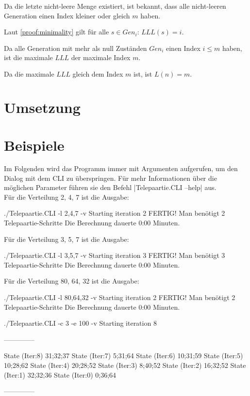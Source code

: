 \documentclass[a4paper,10pt,ngerman]{scrartcl}
\begin{document}
Da die letzte nicht-leere Menge existiert, ist bekannt, dass alle nicht-leeren Generation einen Index kleiner oder gleich \(m\) haben.

Laut \cref{proof:minimality} gilt für alle \(s \in Gen_i\): \(LLL(s) = i\).

Da alle Generation mit mehr als null Zuständen \(Gen_i\) einen Index \(i \leq m\) haben, ist die maximale \(LLL\) der maximale Index \(m\).

Da die maximale \(LLL\) gleich dem Index \(m\) ist, ist \(L(n) = m\).

\section{Umsetzung}

\section{Beispiele}
Im Folgenden wird das Programm immer mit Argumenten aufgerufen, um den Dialog mit dem CLI zu überspringen. Für mehr Informationen über die möglichen Parameter führen sie den Befehl |Telepaartie.CLI --help| aus.\\
\vspace{0.5cm}
Für die Verteilung 2, 4, 7 ist die Ausgabe:
\begin{lstcs}
./Telepaartie.CLI -l 2,4,7 -v
Starting iteration 2
FERTIG!
Man benötigt 2 Telepaartie-Schritte
Die Berechnung dauerte 0:00 Minuten.
\end{lstcs}
Für die Verteilung 3, 5, 7 ist die Ausgabe:
\begin{lstcs}
./Telepaartie.CLI -l 3,5,7 -v
Starting iteration 3
FERTIG!
Man benötigt 3 Telepaartie-Schritte
Die Berechnung dauerte 0:00 Minuten.
\end{lstcs}
Für die Verteilung 80, 64, 32 ist die Ausgabe:
\begin{lstcs}
./Telepaartie.CLI -l 80,64,32 -v
Starting iteration 2
FERTIG!
Man benötigt 2 Telepaartie-Schritte
Die Berechnung dauerte 0:00 Minuten.
\end{lstcs}
./Telepaartie.CLI -c 3 -e 100 -v
Starting iteration 8

--------------

State (Iter:8) {31;32;37}
State (Iter:7) {5;31;64}
State (Iter:6) {10;31;59}
State (Iter:5) {10;28;62}
State (Iter:4) {20;28;52}
State (Iter:3) {8;40;52}
State (Iter:2) {16;32;52}
State (Iter:1) {32;32;36}
State (Iter:0) {0;36;64}

--------------
\end{document}
